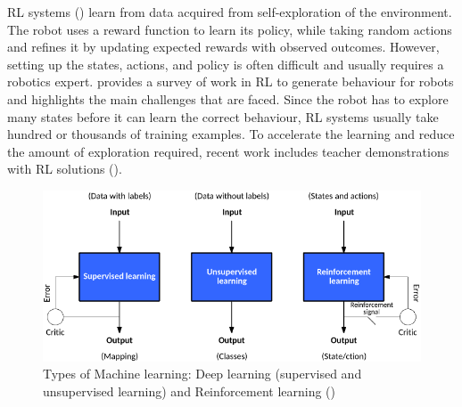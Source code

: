 RL systems (\cite{sutton1998reinforcement,kaelbling1996reinforcement,gosavi2009reinforcement}) learn from data acquired from self-exploration of the environment. 
The robot uses a reward function to learn its policy, while taking random actions and refines it by updating expected rewards with observed outcomes.
However, setting up the states, actions, and policy is often difficult and usually requires a robotics expert.
\cite{kober2013reinforcement} provides a survey of work in RL to generate behaviour for robots and highlights the main challenges that are faced.
Since the robot has to explore many states before it can learn the correct behaviour, RL systems usually take hundred or thousands of training examples.
To accelerate the learning and reduce the amount of exploration required, recent work includes teacher demonstrations with RL solutions (\cite{martinez2017relational,hester2017learning}).



\begin{figure}[ht]
	\centering
	\includegraphics[width=\linewidth]{figures/ml-techniques}
	\caption{Types of Machine learning: Deep learning (supervised and unsupervised learning) and Reinforcement learning (\cite{jones2017models})}
	\label{fig:ml-types}
\end{figure}

